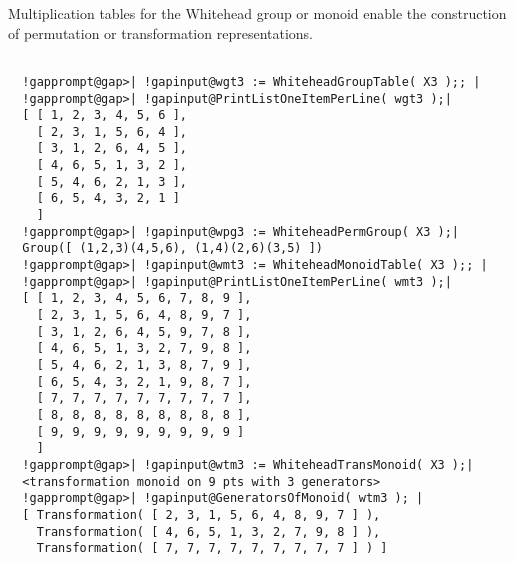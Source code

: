 \documentclass[a4paper,11pt]{report}
\begin{document}
{{{ Multiplication tables for the Whitehead group or monoid enable the
construction of permutation or transformation representations. }

 

 
\begin{Verbatim}[commandchars=!@|,fontsize=\small,frame=single,label=Example]
  
  !gapprompt@gap>| !gapinput@wgt3 := WhiteheadGroupTable( X3 );; |
  !gapprompt@gap>| !gapinput@PrintListOneItemPerLine( wgt3 );|
  [ [ 1, 2, 3, 4, 5, 6 ],
    [ 2, 3, 1, 5, 6, 4 ],
    [ 3, 1, 2, 6, 4, 5 ],
    [ 4, 6, 5, 1, 3, 2 ],
    [ 5, 4, 6, 2, 1, 3 ],
    [ 6, 5, 4, 3, 2, 1 ]
    ]
  !gapprompt@gap>| !gapinput@wpg3 := WhiteheadPermGroup( X3 );|
  Group([ (1,2,3)(4,5,6), (1,4)(2,6)(3,5) ])
  !gapprompt@gap>| !gapinput@wmt3 := WhiteheadMonoidTable( X3 );; |
  !gapprompt@gap>| !gapinput@PrintListOneItemPerLine( wmt3 );|
  [ [ 1, 2, 3, 4, 5, 6, 7, 8, 9 ],
    [ 2, 3, 1, 5, 6, 4, 8, 9, 7 ],
    [ 3, 1, 2, 6, 4, 5, 9, 7, 8 ],
    [ 4, 6, 5, 1, 3, 2, 7, 9, 8 ],
    [ 5, 4, 6, 2, 1, 3, 8, 7, 9 ],
    [ 6, 5, 4, 3, 2, 1, 9, 8, 7 ],
    [ 7, 7, 7, 7, 7, 7, 7, 7, 7 ],
    [ 8, 8, 8, 8, 8, 8, 8, 8, 8 ],
    [ 9, 9, 9, 9, 9, 9, 9, 9, 9 ]
    ]
  !gapprompt@gap>| !gapinput@wtm3 := WhiteheadTransMonoid( X3 );|
  <transformation monoid on 9 pts with 3 generators>
  !gapprompt@gap>| !gapinput@GeneratorsOfMonoid( wtm3 ); |
  [ Transformation( [ 2, 3, 1, 5, 6, 4, 8, 9, 7 ] ), 
    Transformation( [ 4, 6, 5, 1, 3, 2, 7, 9, 8 ] ), 
    Transformation( [ 7, 7, 7, 7, 7, 7, 7, 7, 7 ] ) ]
  
\end{Verbatim}
 }

 }

          
\end{document}

